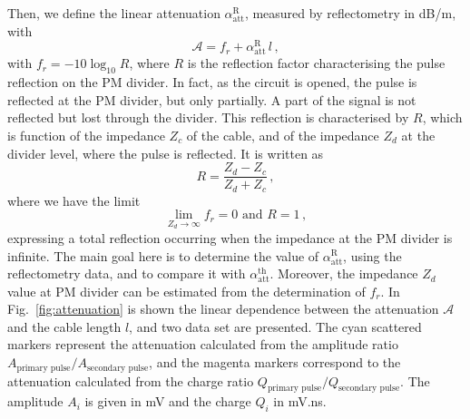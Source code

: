 Then, we define the linear attenuation $\alpha_{\text{att}}^{\text{R}}$, measured by reflectometry in dB/m, with
\begin{equation}
  \mathcal{A} = f_{r}+\alpha_{\text{att}}^{\text{R}}\,l\,,
\end{equation}
with $f_{r} = -10\log_{10}R$, where $R$ is the reflection factor characterising the pulse reflection on the PM divider.
In fact, as the circuit is opened, the pulse is reflected at the PM divider, but only partially.
A part of the signal is not reflected but lost through the divider.
This reflection is characterised by $R$, which is function of the impedance $Z_{c}$ of the cable, and of the impedance $Z_{d}$ at the divider level, where the pulse is reflected.
It is written as
\begin{equation}
  R = \frac{Z_{d}-Z_{c}}{Z_{d}+Z_{c}}\,,
\end{equation}
where we have the limit
\begin{equation}
  \lim_{Z_{d} \to \infty} f_{r} = 0 \text{ and } R=1\,,
\end{equation}
expressing a total reflection occurring when the impedance at the PM divider is infinite.
The main goal here is to determine the value of $\alpha_{\text{att}}^{\text{R}}$, using the reflectometry data, and to compare it with $\alpha_{\text{att}}^{\text{th}}$.
Moreover, the impedance $Z_{d}$ value at PM divider can be estimated from the determination of $f_{r}$.
In Fig.~\ref{fig:attenuation} is shown the linear dependence between the attenuation $\mathcal{A}$ and the cable length $l$, and two data set are presented.
The cyan scattered markers represent the attenuation calculated from the amplitude ratio $A_{\text{primary pulse}}/A_{\text{secondary pulse}}$, and the magenta markers correspond to the attenuation calculated from the charge ratio $Q_{\text{primary pulse}}/Q_{\text{secondary pulse}}$.
The amplitude $A_{i}$ is given in mV and the charge $Q_{i}$ in mV.ns.
